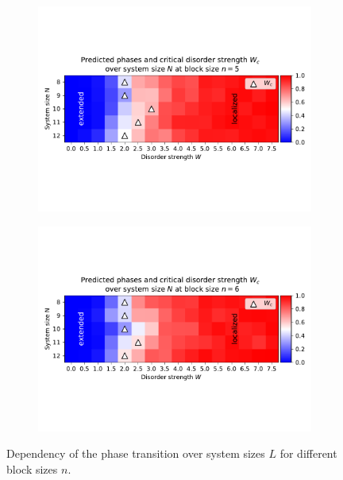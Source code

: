\documentclass[reprint,amsmath,amssymb,aps,prb]{revtex4-2}
\begin{document}
\begin{center}
\begin{figure}[h]
\begin{subfigure}[c]{0.4\textwidth}
			\includegraphics[width=\textwidth, trim={0 3cm 0 3cm},clip]{../results/Wc/n5_Wc_N_dependency.pdf}
		\end{subfigure}
	\end{figure}
	\begin{figure}[h]\ContinuedFloat
		\begin{subfigure}[c]{0.4\textwidth}
			\includegraphics[width=\textwidth, trim={0 3cm 0 3cm},clip]{../results/Wc/n6_Wc_N_dependency.pdf}
		\end{subfigure}
		\caption{Dependency of the phase transition over system sizes $L$ for different block sizes $n$.}
		\label{fig:wcextract}
	\end{figure}
\end{center}
\end{document}
